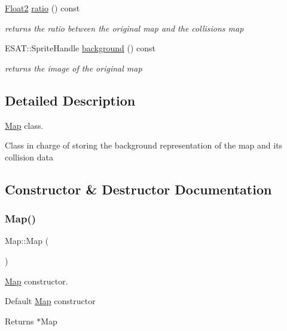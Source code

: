\begin{DoxyCompactItemize}
\mbox{\hyperlink{class_float2}{Float2}} \mbox{\hyperlink{class_map_ad27c66a5bfffc6aeb8c786b7edb19d22}{ratio}} () const
\begin{DoxyCompactList}\small\item\em returns the ratio between the original map and the collisions map \end{DoxyCompactList}\item 
E\+S\+A\+T\+::\+Sprite\+Handle \mbox{\hyperlink{class_map_ad2be03ca3f10013e1017c0ad4903641b}{background}} () const
\begin{DoxyCompactList}\small\item\em returns the image of the original map \end{DoxyCompactList}\end{DoxyCompactItemize}


\subsection{Detailed Description}
\mbox{\hyperlink{class_map}{Map}} class. 

Class in charge of storing the background representation of the map and it\textquotesingle{}s collision data 

\subsection{Constructor \& Destructor Documentation}
\mbox{\label{class_map_a0f5ad0fd4563497b4214038cbca8b582}} 
\subsubsection{\texorpdfstring{Map()}{Map()}}
{\footnotesize\ttfamily Map\+::\+Map (\begin{DoxyParamCaption}{ }\end{DoxyParamCaption})}



\mbox{\hyperlink{class_map}{Map}} constructor. 

Default \mbox{\hyperlink{class_map}{Map}} constructor

\begin{DoxyReturn}{Returns}
$\ast$\+Map 
\end{DoxyReturn}
\mbox{\label{class_map_aa403fbe09394ccf39747588f5168e3b2}} 

